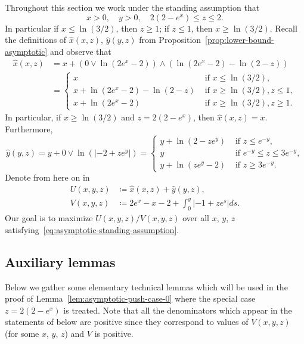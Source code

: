 \documentclass[a4paper]{amsart} %
\theoremstyle{definition}
\theoremstyle{remark}
\numberwithin{equation}{section}
\newcommand*{\xGain}{\hat{x}}
\newcommand*{\yGain}{\hat{y}}
\newcommand*{\XXXasymptoticDenominator}{V}
\newcommand*{\XXXasymptoticNominator}{U}
\begin{document}
Throughout this section we work under the standing assumption
that
\begin{equation}
\label{eq:asymptotic-standing-assumption}
x>0, \quad y>0, \quad 2(2-e^x)\leq z \leq 2.
\end{equation}
In particular if $x\leq \ln(3/2)$, then $z\geq 1$;
if $z\leq 1$, then $x\geq \ln(3/2)$.
Recall the definitions of
$\xGain(x,z)$, $\yGain(y,z)$ from Proposition~\ref{prop:lower-bound-asymptotic}
and observe that 
\begin{align*}
\xGain(x,z) &= x + (0 \lor \ln(2e^x - 2))\land (\ln(2e^x-2) - \ln(2-z))\\
&= \begin{cases}
x                          & \text{ if }  x\leq \ln(3/2),\\
x + \ln(2e^x-2) - \ln(2-z) & \text{ if } x\geq \ln(3/2), z \leq 1,\\
x + \ln(2e^x-2)            & \text{ if } x\geq \ln(3/2), z \geq 1.
\end{cases}
\end{align*}
In particular, if  $x\geq \ln(3/2)$ and $z = 2(2-e^x)$, then $\xGain(x,z) = x$.
Furthermore,
\begin{equation*}
\yGain(y,z) = y +  0\lor \ln(|-2 + z e^{y}|) = \begin{cases}
y + \ln(2- ze^{y})      & \text{ if }  z \leq e^{-y},\\
y                       & \text{ if } e^{-y} \leq z \leq 3e^{-y},\\
y + \ln(ze^y - 2)       & \text{ if } z \geq 3e^{-y}.
\end{cases}
\end{equation*}
Denote from here on in
\begin{align*}
\XXXasymptoticNominator(x,y,z) &\coloneqq \xGain(x,z) + \yGain(y,z),\\
\XXXasymptoticDenominator(x,y,z) &\coloneqq 2e^x - x -2 + \int_{0}^{y} | -1 +  z  e^{s}| ds.
\end{align*}
Our goal is to maximize $\XXXasymptoticNominator(x,y,z)/\XXXasymptoticDenominator(x,y,z)$ over all $x$, $y$, $z$ satisfying~\eqref{eq:asymptotic-standing-assumption}.


\subsection{Auxiliary lemmas}

Below we gather some elementary technical lemmas
which will be used 
in the proof of Lemma~\ref{lem:asymptotic-push-case-0} where the special case $z = 2(2-e^x)$ is treated.
Note that all the denominators which appear in the statements of  below are positive
since they correspond to values of  $\XXXasymptoticDenominator(x,y,z)$
(for some $x$, $y$, $z$) and $\XXXasymptoticDenominator$ is positive.
\end{document}
